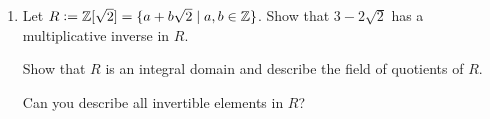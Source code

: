 \documentclass[12pt]{article}
\newcommand{\ZZ}{{\mathbb Z}}
\begin{document}
\begin{enumerate}
\item
  Let $R\vcentcolon= \ZZ[\sqrt{2}]=\{ a + b\sqrt{2} \mid a,b\in\ZZ\}$.
  Show that $3- 2\sqrt{2}$ has a multiplicative inverse in $R$.

  Show that $R$ is an integral domain and describe the field of quotients of $R$.

  Can you describe all invertible elements in $R$?




\end{enumerate}
\end{document}
